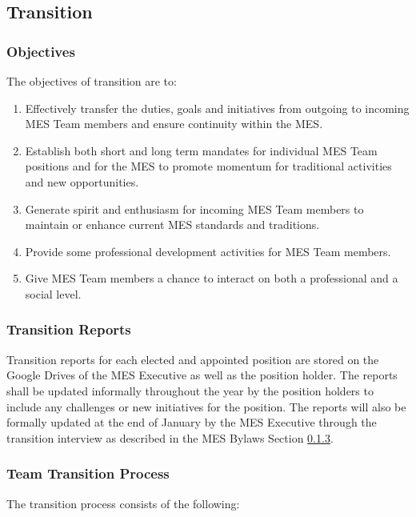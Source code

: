 \subsection{Transition}
\label{transition}
\subsubsection{Objectives}
\label{objectives}
The objectives of transition are to:

\begin{enumerate}
 \item
  Effectively transfer the duties, goals and initiatives from outgoing to incoming MES Team members and ensure continuity within the MES.
 \item
  Establish both short and long term mandates for individual MES Team positions and for the MES to promote momentum for traditional activities and new opportunities.
 \item
  Generate spirit and enthusiasm for incoming MES Team members to maintain or enhance current MES standards and traditions.
 \item
  Provide some professional development activities for MES Team members.
 \item
  Give MES Team members a chance to interact on both a professional and a social level.

\end{enumerate}

\subsubsection{Transition Reports}
\label{transition-reports}
Transition reports for each elected and appointed position are stored on
the Google Drives of the MES Executive as well as the position holder.
The reports shall be updated informally throughout the year by the
position holders to include any challenges or new initiatives for the
position. The reports will also be formally updated at the end of
January by the MES Executive through the transition interview as
described in the MES Bylaws Section \ref{team-transition-process}. %

\subsubsection{Team Transition Process}
\label{team-transition-process}

The transition process consists of the following:

